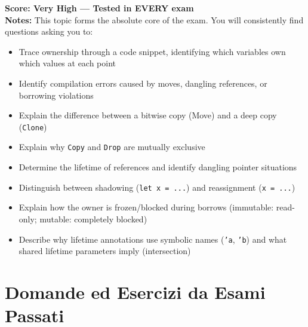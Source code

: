 \textbf{Score: Very High --- Tested in EVERY exam} \\
\textbf{Notes:} This topic forms the absolute core of the exam. You will consistently find questions asking you to:
\begin{itemize}
    \item Trace ownership through a code snippet, identifying which variables own which values at each point
    \item Identify compilation errors caused by moves, dangling references, or borrowing violations
    \item Explain the difference between a bitwise copy (Move) and a deep copy (\texttt{Clone})
    \item Explain why \texttt{Copy} and \texttt{Drop} are mutually exclusive
    \item Determine the lifetime of references and identify dangling pointer situations
    \item Distinguish between shadowing (\texttt{let x = ...}) and reassignment (\texttt{x = ...})
    \item Explain how the owner is frozen/blocked during borrows (immutable: read-only; mutable: completely blocked)
    \item Describe why lifetime annotations use symbolic names (\texttt{'a}, \texttt{'b}) and what shared lifetime parameters imply (intersection)
\end{itemize}

\section{Domande ed Esercizi da Esami Passati}

